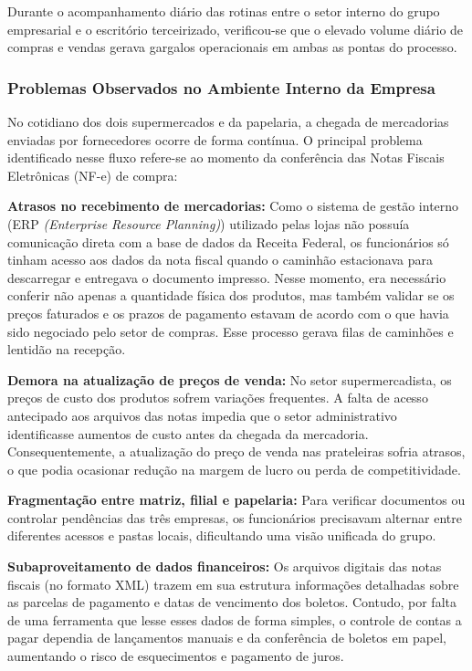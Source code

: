 \documentclass[12pt]{article}
\begin{document}
Durante o acompanhamento diário das rotinas entre o setor interno do grupo empresarial e o escritório terceirizado, verificou-se que o elevado volume diário de compras e vendas gerava gargalos operacionais em ambas as pontas do processo.

\subsubsection{Problemas Observados no Ambiente Interno da Empresa}

No cotidiano dos dois supermercados e da papelaria, a chegada de mercadorias enviadas por fornecedores ocorre de forma contínua. O principal problema identificado nesse fluxo refere-se ao momento da conferência das Notas Fiscais Eletrônicas (NF-e) de compra:

\begingroup
\setlength{\parskip}{0pt}
\setlength{\parindent}{0pt}

\textbf{Atrasos no recebimento de mercadorias:} Como o sistema de gestão interno (ERP \textit{(Enterprise Resource Planning)}) utilizado pelas lojas não possuía comunicação direta com a base de dados da Receita Federal, os funcionários só tinham acesso aos dados da nota fiscal quando o caminhão estacionava para descarregar e entregava o documento impresso. Nesse momento, era necessário conferir não apenas a quantidade física dos produtos, mas também validar se os preços faturados e os prazos de pagamento estavam de acordo com o que havia sido negociado pelo setor de compras. Esse processo gerava filas de caminhões e lentidão na recepção.

\textbf{Demora na atualização de preços de venda:} No setor supermercadista, os preços de custo dos produtos sofrem variações frequentes. A falta de acesso antecipado aos arquivos das notas impedia que o setor administrativo identificasse aumentos de custo antes da chegada da mercadoria. Consequentemente, a atualização do preço de venda nas prateleiras sofria atrasos, o que podia ocasionar redução na margem de lucro ou perda de competitividade.

\textbf{Fragmentação entre matriz, filial e papelaria:} Para verificar documentos ou controlar pendências das três empresas, os funcionários precisavam alternar entre diferentes acessos e pastas locais, dificultando uma visão unificada do grupo.

\textbf{Subaproveitamento de dados financeiros:} Os arquivos digitais das notas fiscais (no formato XML) trazem em sua estrutura informações detalhadas sobre as parcelas de pagamento e datas de vencimento dos boletos. Contudo, por falta de uma ferramenta que lesse esses dados de forma simples, o controle de contas a pagar dependia de lançamentos manuais e da conferência de boletos em papel, aumentando o risco de esquecimentos e pagamento de juros.
\end{document}
